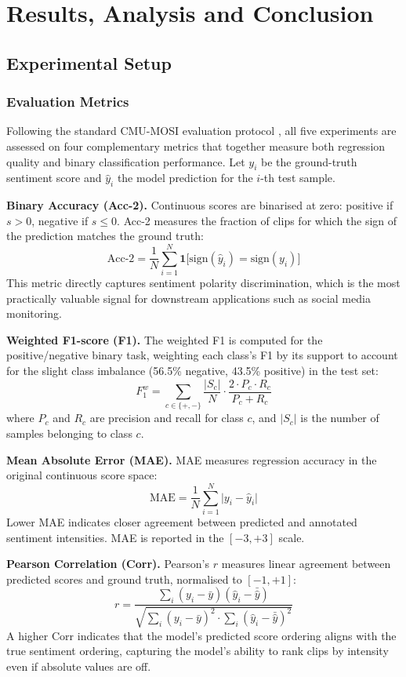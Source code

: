\chapter{Results, Analysis and Conclusion}
\onehalfspacing

\section{Experimental Setup}

\subsection{Evaluation Metrics}

Following the standard CMU-MOSI evaluation protocol \cite{zadeh2016mosi}, all five experiments are assessed on four complementary metrics that together measure both regression quality and binary classification performance. Let $y_i$ be the ground-truth sentiment score and $\hat{y}_i$ the model prediction for the $i$-th test sample.

\textbf{Binary Accuracy (Acc-2).} Continuous scores are binarised at zero: positive if $s > 0$, negative if $s \leq 0$. Acc-2 measures the fraction of clips for which the sign of the prediction matches the ground truth:
\[
\text{Acc-2} = \frac{1}{N}\sum_{i=1}^{N} \mathbf{1}\bigl[\text{sign}(\hat{y}_i) = \text{sign}(y_i)\bigr]
\]
This metric directly captures sentiment polarity discrimination, which is the most practically valuable signal for downstream applications such as social media monitoring.

\textbf{Weighted F1-score (F1).} The weighted F1 is computed for the positive/negative binary task, weighting each class's F1 by its support to account for the slight class imbalance (56.5\% negative, 43.5\% positive) in the test set:
\[
F_1^{w} = \sum_{c \in \{+,-\}} \frac{|S_c|}{N} \cdot \frac{2 \cdot P_c \cdot R_c}{P_c + R_c}
\]
where $P_c$ and $R_c$ are precision and recall for class $c$, and $|S_c|$ is the number of samples belonging to class $c$.

\textbf{Mean Absolute Error (MAE).} MAE measures regression accuracy in the original continuous score space:
\[
\text{MAE} = \frac{1}{N}\sum_{i=1}^{N}\bigl|y_i - \hat{y}_i\bigr|
\]
Lower MAE indicates closer agreement between predicted and annotated sentiment intensities. MAE is reported in the $[-3, +3]$ scale.

\textbf{Pearson Correlation (Corr).} Pearson's $r$ measures linear agreement between predicted scores and ground truth, normalised to $[-1, +1]$:
\[
r = \frac{\sum_i (y_i - \bar{y})(\hat{y}_i - \bar{\hat{y}})}{\sqrt{\sum_i (y_i - \bar{y})^2 \cdot \sum_i (\hat{y}_i - \bar{\hat{y}})^2}}
\]
A higher Corr indicates that the model's predicted score ordering aligns with the true sentiment ordering, capturing the model's ability to rank clips by intensity even if absolute values are off.

